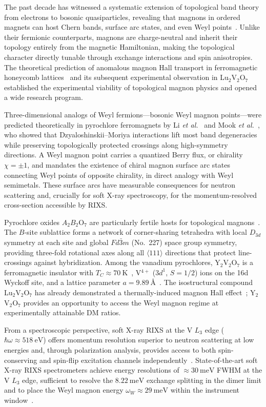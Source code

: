 \documentclass[aps,prb,twocolumn,superscriptaddress,longbibliography]{revtex4-2}
\begin{document}
The past decade has witnessed a systematic extension of topological band theory
from electrons to bosonic quasiparticles, revealing that magnons in ordered
magnets can host Chern bands, surface arc states, and even Weyl
points~\cite{McClarty2022,Shindou2013}.
Unlike their fermionic counterparts, magnons are charge-neutral and inherit
their topology entirely from the magnetic Hamiltonian, making the topological
character directly tunable through exchange interactions and spin anisotropies.
The theoretical prediction of anomalous magnon Hall transport in ferromagnetic
honeycomb lattices~\cite{Owerre2016} and its subsequent experimental observation
in Lu$_2$V$_2$O$_7$~\cite{Onose2010} established the experimental viability of
topological magnon physics and opened a wide research program.

Three-dimensional analogs of Weyl fermions---bosonic Weyl magnon
points---were predicted theoretically in pyrochlore ferromagnets by Li
\textit{et al.}~\cite{Li2016} and Mook \textit{et al.}~\cite{Mook2016},
who showed that Dzyaloshinskii--Moriya interactions lift most band degeneracies
while preserving topologically protected crossings along high-symmetry
directions.
A Weyl magnon point carries a quantized Berry flux, or chirality $\chi = \pm 1$,
and mandates the existence of chiral magnon surface arc states connecting
Weyl points of opposite chirality, in direct analogy with Weyl semimetals.
These surface arcs have measurable consequences for neutron scattering and,
crucially for soft X-ray spectroscopy, for the momentum-resolved cross-section
accessible by RIXS.

Pyrochlore oxides $A_2B_2$O$_7$ are particularly fertile hosts for topological
magnons~\cite{Bramwell2001}.
The $B$-site sublattice forms a network of corner-sharing tetrahedra with local
$D_{3d}$ symmetry at each site and global $Fd\bar{3}m$ (No.~227) space group
symmetry, providing three-fold rotational axes along all $\langle 111 \rangle$
directions that protect line-crossings against hybridization.
Among the vanadium pyrochlores, Y$_2$V$_2$O$_7$ is a ferromagnetic insulator
with $T_C \approx \SI{70}{\kelvin}$~\cite{Ideue2012}, V$^{4+}$ ($3d^1$, $S=1/2$) ions on the
16d Wyckoff site, and a lattice parameter $a = \SI{9.89}{\angstrom}$~\cite{Gardner2010}.
The isostructural compound Lu$_2$V$_2$O$_7$ has already demonstrated a
thermally-induced magnon Hall effect~\cite{Onose2010}; Y$_2$V$_2$O$_7$
provides an opportunity to access the Weyl magnon regime at experimentally
attainable DM ratios.

From a spectroscopic perspective, soft X-ray RIXS at the V $L_3$ edge
($\hbar\omega \approx \SI{518}{\eV}$) offers momentum resolution superior to
neutron scattering at low energies and, through polarization analysis, provides
access to both spin-conserving and spin-flip excitation channels
independently~\cite{Wang2019}.
State-of-the-art soft X-ray RIXS spectrometers achieve energy resolutions
of $\approx \SI{30}{\milli\eV}$ FWHM at the V $L_3$ edge, sufficient to
resolve the $\SI{8.22}{\milli\eV}$ exchange splitting in the dimer limit and
to place the Weyl magnon energy $\omega_W \approx \SI{29}{\milli\eV}$ within
the instrument window~\cite{Ament2011}.
\end{document}
